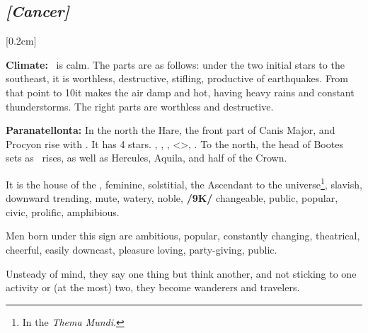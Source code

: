 \secbr
\subsection{\textit{[Cancer]}}
[0.2cm]

\textbf{Climate:}  \Cancer\, is calm. The parts are as follows: under the two initial stars to the southeast, it is worthless, destructive, stifling, productive of earthquakes. From that point to 10\deg it makes the air damp and hot, having heavy rains and constant thunderstorms. The right parts are worthless and destructive. 

\textbf{Paranatellonta:} In the north the Hare, the front part of Canis Major, and Procyon rise with \Cancer. It has 4 stars. \Mars, \Mercury, \Jupiter, <\Neptune>, \Venus. To the north, the head of Bootes sets as \Cancer\, rises, as well as Hercules, Aquila, and half of the Crown.

It is the house of the \Moon,  feminine,  solstitial, the Ascendant to the universe\footnote{In the \textit{Thema Mundi}.},  slavish, downward trending,  mute,  watery, noble, \textbf{/9K/} changeable, public, popular, civic,  prolific, amphibious. 

Men born under this sign are ambitious, popular, constantly changing, theatrical, cheerful, easily downcast, pleasure loving, party-giving, public. 

Unsteady of mind, they say one thing but think another, and not sticking to one activity or (at the most) two, they become wanderers and travelers.


